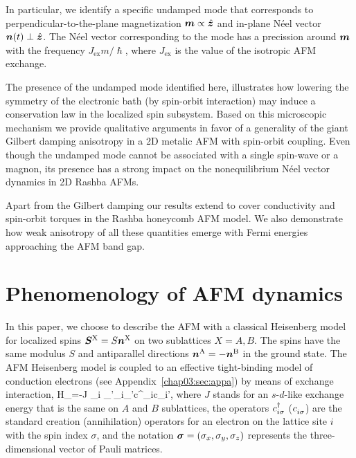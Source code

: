 In particular, we identify a specific undamped mode that corresponds to perpendicular-to-the-plane magnetization $\boldsymbol{m} \propto \hat{\boldsymbol{z}}$ and in-plane N\'eel vector $\boldsymbol{n}(t) \perp \hat{\boldsymbol{z}}$. The N\'eel vector corresponding to the mode has a precission around $\boldsymbol{m}$ with the frequency $J_\textrm{ex} m/\hslash$, where $J_\textrm{ex}$ is the value of the isotropic AFM exchange.

The presence of the undamped mode identified here, illustrates how lowering the symmetry of the electronic bath (by spin-orbit interaction) may induce a conservation law in the localized spin subsystem. Based on this microscopic mechanism we provide qualitative arguments in favor of a generality of the giant Gilbert damping anisotropy in a 2D metalic AFM with spin-orbit coupling. Even though the undamped mode cannot be associated with a single spin-wave or a magnon, its presence has a strong impact on the nonequilibrium N\'eel vector dynamics in 2D Rashba AFMs.

Apart from the Gilbert damping our results extend to cover conductivity and spin-orbit torques in the Rashba honeycomb AFM model. We also demonstrate how weak anisotropy of all these quantities emerge with Fermi energies approaching the AFM band gap. 

\section{Phenomenology of AFM dynamics}

In this paper, we choose to describe the AFM with a classical Heisenberg model for localized spins $\boldsymbol{S}^\textrm{X}= S \boldsymbol{n}^\textrm{X}$ on two sublattices $X=A,B$. The spins have the same modulus $S$ and antiparallel directions $\boldsymbol{n}^\textrm{A}=-\boldsymbol{n}^\textrm{B}$ in the ground state. The AFM Heisenberg model is coupled to an effective tight-binding model of conduction electrons (see Appendix~\ref{chap03:sec:appa}) by means of exchange interaction,
\be
\label{chap03:ex}
H_=-J \s_{i} \s_{\sigma\sigma'}_i\cdot \bb{\sigma}_{\sigma\sigma'}c^\dagger_{i\sigma}c\0_{i\sigma'},
\e
where $J$ stands for an $s$-$d$-like exchange energy that is the same on $A$ and $B$ sublattices, the operators $c^\dagger_{i\sigma}$ ($c\0_{i\sigma}$) are the standard creation (annihilation) operators for an electron on the lattice site $i$ with the spin index $\sigma$, and the notation $\boldsymbol{\sigma}=(\sigma_x,\sigma_y,\sigma_z)$ represents the three-dimensional vector of Pauli matrices. 

